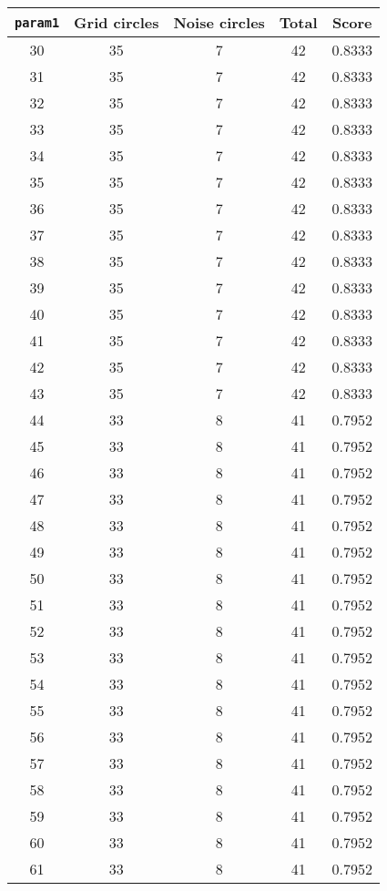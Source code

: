 \documentclass[letterpaper, 12pt]{article}
\begin{document}
\begin{longtable}{|c|c|c|c|c|}
\hline
\textbf{\texttt{param1}} & \textbf{Grid circles} & \textbf{Noise circles} & \textbf{Total} & \textbf{Score} \\
\hline
30 & 35 & 7 & 42 & 0.8333 \\
\hline
31 & 35 & 7 & 42 & 0.8333 \\
\hline
32 & 35 & 7 & 42 & 0.8333 \\
\hline
33 & 35 & 7 & 42 & 0.8333 \\
\hline
34 & 35 & 7 & 42 & 0.8333 \\
\hline
35 & 35 & 7 & 42 & 0.8333 \\
\hline
36 & 35 & 7 & 42 & 0.8333 \\
\hline
37 & 35 & 7 & 42 & 0.8333 \\
\hline
38 & 35 & 7 & 42 & 0.8333 \\
\hline
39 & 35 & 7 & 42 & 0.8333 \\
\hline
40 & 35 & 7 & 42 & 0.8333 \\
\hline
41 & 35 & 7 & 42 & 0.8333 \\
\hline
42 & 35 & 7 & 42 & 0.8333 \\
\hline
43 & 35 & 7 & 42 & 0.8333 \\
\hline
44 & 33 & 8 & 41 & 0.7952 \\
\hline
45 & 33 & 8 & 41 & 0.7952 \\
\hline
46 & 33 & 8 & 41 & 0.7952 \\
\hline
47 & 33 & 8 & 41 & 0.7952 \\
\hline
48 & 33 & 8 & 41 & 0.7952 \\
\hline
49 & 33 & 8 & 41 & 0.7952 \\
\hline
50 & 33 & 8 & 41 & 0.7952 \\
\hline
51 & 33 & 8 & 41 & 0.7952 \\
\hline
52 & 33 & 8 & 41 & 0.7952 \\
\hline
53 & 33 & 8 & 41 & 0.7952 \\
\hline
54 & 33 & 8 & 41 & 0.7952 \\
\hline
55 & 33 & 8 & 41 & 0.7952 \\
\hline
56 & 33 & 8 & 41 & 0.7952 \\
\hline
57 & 33 & 8 & 41 & 0.7952 \\
\hline
58 & 33 & 8 & 41 & 0.7952 \\
\hline
59 & 33 & 8 & 41 & 0.7952 \\
\hline
60 & 33 & 8 & 41 & 0.7952 \\
\hline
61 & 33 & 8 & 41 & 0.7952 \\

\end{longtable}
\end{document}

